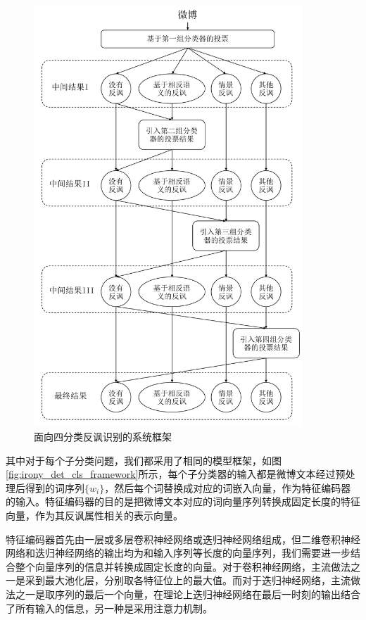 \begin{figure}[H]
  \centering
  \includegraphics[width=0.9\textwidth]{img/irony_det_system.pdf}
  \caption{面向四分类反讽识别的系统框架}
  \label{fig:irony_det_system}
\end{figure}

其中对于每个子分类问题，我们都采用了相同的模型框架，如图\ref{fig:irony_det_cls_framework}所示，每个子分类器的输入都是微博文本经过预处理后得到的词序列$\{w_i\}$，然后每个词替换成对应的词嵌入向量，作为特征编码器的输入。特征编码器的目的是把微博文本对应的词向量序列转换成固定长度的特征向量，作为其反讽属性相关的表示向量。

特征编码器首先由一层或多层卷积神经网络或迭归神经网络组成，但二维卷积神经网络和迭归神经网络的输出均为和输入序列等长度的向量序列，我们需要进一步结合整个向量序列的信息并转换成固定长度的向量。对于卷积神经网络，主流做法之一是采到最大池化层，分别取各特征位上的最大值。而对于迭归神经网络，主流做法之一是取序列的最后一个向量，在理论上迭归神经网络在最后一时刻的输出结合了所有输入的信息，另一种是采用注意力机制。

